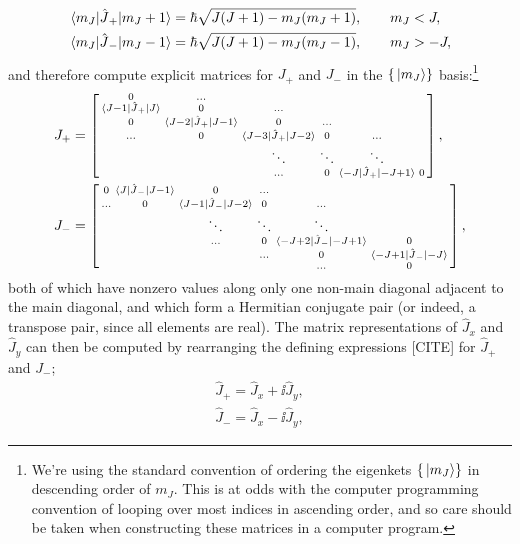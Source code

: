 \begin{align}
\matrixel{m_J}{\hat J_+}{m_J + 1} &= \hbar\sqrt{J(J + 1) - m_J(m_J + 1)}, \qquad m_J < J,\\
\matrixel{m_J}{\hat J_-}{m_J - 1} &= \hbar\sqrt{J(J + 1) - m_J(m_J - 1)}, \qquad m_J > -J,\\
\end{align}
and therefore compute explicit matrices for $J_+$ and $J_-$ in the $\{\ket{m_J}\}$ basis:\footnote{We're using the standard convention of ordering the eigenkets $\{\ket{m_J}\}$ in descending order of $m_J$. This is at odds with the computer programming convention of looping over most indices in ascending order, and so care should be taken when constructing these matrices in a computer program.}
\begin{align}
J_+ &=
\left[\begin{smallmatrix}
    0 & \hdots \\
    \matrixel{J - 1}{\hat J_+}{J} & 0 & \hdots\\
    0 & \matrixel{J - 2}{\hat J_+}{J - 1} & 0 & \hdots\\
    \hdots & 0 & \matrixel{J - 3}{\hat J_+}{J - 2} & 0 & \hdots\\
    & & \ddots & \ddots & \ddots\\
    & & \hdots & 0 & \matrixel{-J}{\hat J_+}{-J + 1} & 0 \\
\end{smallmatrix} \right],\\
J_- &=
\left[\begin{smallmatrix}
0 &  \matrixel{J}{\hat J_-}{J - 1} & 0 & \hdots\\
\hdots & 0 & \matrixel{J - 1}{\hat J_-}{J - 2} & 0 & \hdots\\
& & \ddots & \ddots & \ddots\\
 & & \hdots & 0 & \matrixel{ -J + 2}{\hat J_-}{-J + 1} & 0\\
 & & & \hdots & 0 & \matrixel{ -J + 1}{\hat J_-}{-J}\\
 & & & & \hdots & 0\\
\end{smallmatrix} \right],
\end{align}
both of which have nonzero values along only one non-main diagonal adjacent to the main diagonal, and which form a Hermitian conjugate pair (or indeed, a transpose pair, since all elements are real). The matrix representations of $\hat J_x$ and $\hat J_y$ can then be computed by rearranging the defining expressions [CITE] for $\hat J_+$ and $J_-$;
\begin{align}
\hat J_+ = \hat J_x + \ii \hat J_y,\\
\hat J_- = \hat J_x - \ii \hat J_y,
\end{align}
